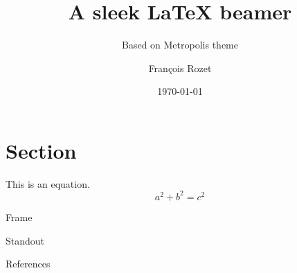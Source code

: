\documentclass[12pt]{beamer}
\title{A sleek \LaTeX{} beamer}
\subtitle{Based on Metropolis theme}
\author{François Rozet}
\institute{University of Liège}
\date{\today}
\begin{document}
\maketitle

\section{Section}

\begin{frame}
    This is an equation. $$ a^2 + b^2 = c^2 $$
\end{frame}

\begin{frame}{Frame}
\end{frame}

\begin{frame}[standout]
  Standout
\end{frame}

\begin{frame}[allowframebreaks]{References}
    \nocite{einstein}
    \nocite{knuthwebsite}
    \nocite{dirac}
    \printbibliography[heading=none]
\end{frame}
\end{document}
